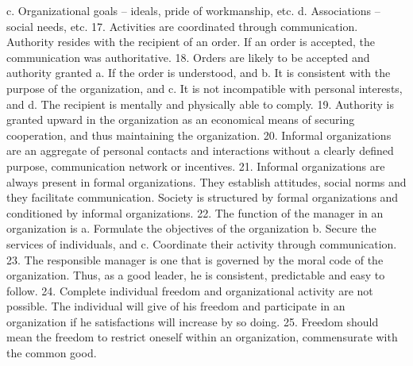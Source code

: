         c. Organizational goals – ideals, pride of workmanship, etc.
        d. Associations – social needs, etc.
    17. Activities are coordinated through communication. Authority resides with the recipient of an order. If an order is accepted, the communication was authoritative.
    18. Orders are likely to be accepted and authority granted
        a. If the order is understood, and
        b. It is consistent with the purpose of the organization, and
        c. It is not incompatible with personal interests, and
        d. The recipient is mentally and physically able to comply.
    19. Authority is granted upward in the organization as an economical means of securing cooperation, and thus maintaining the organization.
    20. Informal organizations are an aggregate of personal contacts and interactions without a clearly defined purpose, communication network or incentives.
    21. Informal organizations are always present in formal organizations. They establish attitudes, social norms and they facilitate communication. Society is structured by formal organizations and conditioned by informal organizations.
    22. The function of the manager in an organization is
        a. Formulate the objectives of the organization
        b. Secure the services of individuals, and 
        c. Coordinate their activity through communication.
    23. The responsible manager is one that is governed by the moral code of the organization. Thus, as a good leader, he is consistent, predictable and easy to follow.
    24. Complete individual freedom and organizational activity are not possible. The individual will give of his freedom and participate in an organization if he satisfactions will increase by so doing.
    25. Freedom should mean the freedom to restrict oneself within an organization, commensurate with the common good.



